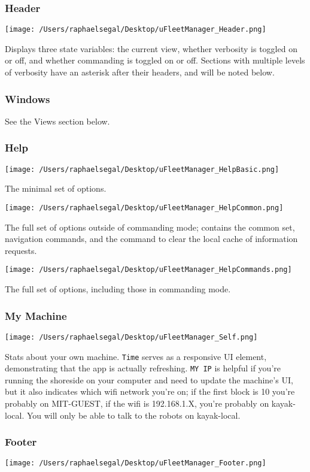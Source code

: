 \documentclass[11pt]{article}
\begin{document}
\subsubsection{Header}
\texttt{[image: /Users/raphaelsegal/Desktop/uFleetManager\_Header.png]}

Displays three state variables: the current view, whether verbosity is toggled on or off, and whether commanding is toggled on or off. Sections with multiple levels of verbosity have an asterisk after their headers, and will be noted below.
\subsubsection{Windows}
See the Views section below.
\subsubsection{Help}
\texttt{[image: /Users/raphaelsegal/Desktop/uFleetManager\_HelpBasic.png]}

The minimal set of options.

\texttt{[image: /Users/raphaelsegal/Desktop/uFleetManager\_HelpCommon.png]}

The full set of options outside of commanding mode; contains the common set, navigation commands, and the command to clear the local cache of information requests.

\texttt{[image: /Users/raphaelsegal/Desktop/uFleetManager\_HelpCommands.png]}

The full set of options, including those in commanding mode.

\subsubsection{My Machine}
\texttt{[image: /Users/raphaelsegal/Desktop/uFleetManager\_Self.png]}

Stats about your own machine. \texttt{Time} serves as a responsive UI element, demonstrating that the app is actually refreshing. \texttt{MY IP} is helpful if you're running the shoreside on your computer and need to update the machine's UI, but it also indicates which wifi network you're on; if the first block is 10 you're probably on MIT-GUEST, if the wifi is 192.168.1.X, you're probably on kayak-local. You will only be able to talk to the robots on kayak-local.
\subsubsection{Footer}
\texttt{[image: /Users/raphaelsegal/Desktop/uFleetManager\_Footer.png]}
\end{document}
